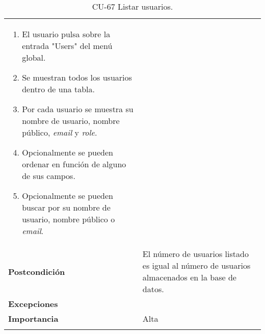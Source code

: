 \begin{longtable}[]{@{}ll@{}}
\begin{minipage}[t]{0.74\columnwidth}
\begin{enumerate}
\def\labelenumi{\arabic{enumi}.}
\tightlist
\item
  El usuario pulsa sobre la entrada "Users" del menú global.
\item
  Se muestran todos los usuarios dentro de una tabla.
\item
  Por cada usuario se muestra su nombre de usuario, nombre público,
  \emph{email} y \emph{role}.
\item
  Opcionalmente se pueden ordenar en función de alguno de sus campos.
\item
  Opcionalmente se pueden buscar por su nombre de usuario, nombre
  público o \emph{email}.
\end{enumerate}\strut
\end{minipage}\tabularnewline
\begin{minipage}[t]{0.20\columnwidth}\raggedright
\textbf{Postcondición}\strut
\end{minipage} & \begin{minipage}[t]{0.74\columnwidth}\raggedright
El número de usuarios listado es igual al número de usuarios almacenados
en la base de datos.\strut
\end{minipage}\tabularnewline
\begin{minipage}[t]{0.20\columnwidth}\raggedright
\textbf{Excepciones}\strut
\end{minipage} & \begin{minipage}[t]{0.74\columnwidth}\raggedright
\strut
\end{minipage}\tabularnewline
\begin{minipage}[t]{0.20\columnwidth}\raggedright
\textbf{Importancia}\strut
\end{minipage} & \begin{minipage}[t]{0.74\columnwidth}\raggedright
Alta\strut
\end{minipage}\tabularnewline
\bottomrule
\caption{CU-67 Listar usuarios.}
\end{longtable}